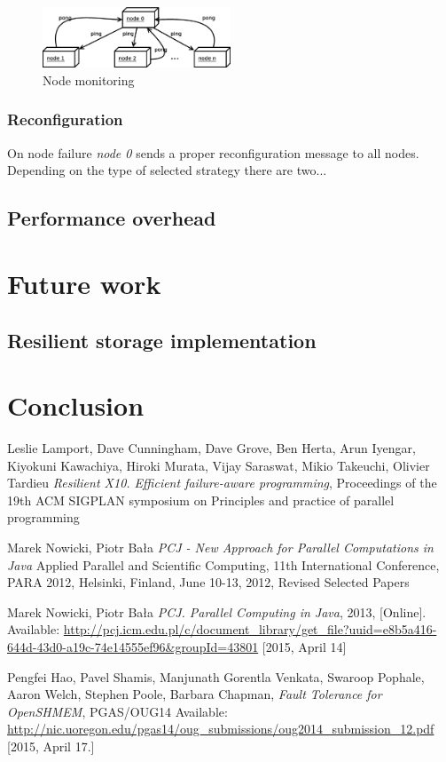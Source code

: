 \documentclass{llncs}
\begin{document}
\begin{figure}
  \centering
      \includegraphics[width=0.5\textwidth]{node-monitoring.eps}
  \caption{Node monitoring}
  \label{pinging}
\end{figure}

\subsubsection{Reconfiguration}
On node failure \textit{node 0} sends a proper reconfiguration message to all nodes.
Depending on the type of selected strategy there are two...

\subsection{Performance overhead}

\section{Future work}
\subsection{Resilient storage implementation}

\section{Conclusion}

\begin{thebibliography}{1}

Leslie Lamport, Dave Cunningham, Dave Grove, Ben Herta, Arun Iyengar, Kiyokuni Kawachiya, Hiroki Murata, Vijay Saraswat, Mikio Takeuchi, Olivier Tardieu
\emph{Resilient X10. Efficient failure-aware programming},
Proceedings of the 19th ACM SIGPLAN symposium on Principles and practice of parallel programming

Marek Nowicki, Piotr Bała
\emph{PCJ - New Approach for Parallel Computations in Java}
Applied Parallel and Scientific Computing, 11th International Conference, PARA 2012, Helsinki, Finland, June 10-13, 2012, Revised Selected Papers

Marek Nowicki, Piotr Bała
\emph{PCJ. Parallel Computing in Java}, 2013, [Online]. Available: \url{http://pcj.icm.edu.pl/c/document_library/get_file?uuid=e8b5a416-644d-43d0-a19c-74e14555ef96&groupId=43801} [2015, April 14]

Pengfei Hao, Pavel Shamis, Manjunath Gorentla Venkata, Swaroop Pophale, Aaron Welch, Stephen Poole, Barbara Chapman, \emph{Fault Tolerance for OpenSHMEM}, PGAS/OUG14
Available: \url{http://nic.uoregon.edu/pgas14/oug_submissions/oug2014_submission_12.pdf} [2015, April 17.]

\end{thebibliography}
\end{document}
